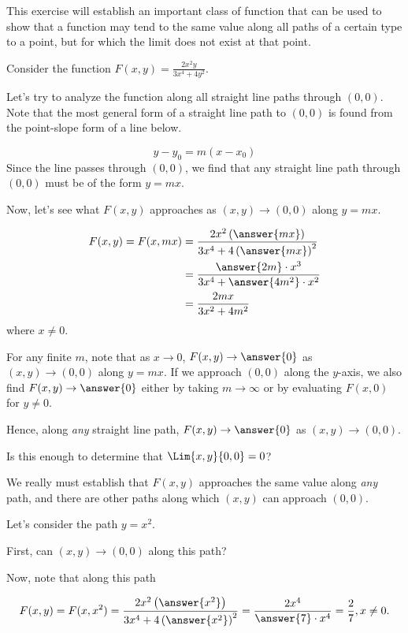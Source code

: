 \documentclass{ximera}
\author{Jim Talamo}
\begin{document}
\begin{exercise}
This exercise will establish an important class of function that can be used to show that a function may tend to the same value along all paths of a certain type to a point, but for which the limit does not exist at that point.

Consider the function $F(x,y) = \frac{2x^2y}{3x^4+4y^2}$.

Let's try to analyze the function along all straight line paths through $(0,0)$.  Note that the most general form of a straight line path to $(0,0)$ is found from the point-slope form of a line below.

\[
y-y_0=m(x-x_0)
\] 
Since the line passes through $(0,0)$, we find that any straight line path through $(0,0)$ must be of the form $y=mx$.

Now, let's see what $F(x,y)$ approaches as $(x,y) \to (0,0)$ along $y=mx$.

\begin{align*}
  F(x,y) = F(x,mx) &= \frac{2x^2\left(\answer{mx}\right)}{3x^4+4\left(\answer{mx}\right)^2} \\
  &= \frac{\answer{2m} \cdot x^3 }{3x^4 + \answer{4m^2}\cdot x^2} \\
  &= \frac{2mx}{3x^2+4m^2}
\end{align*}
where $x \neq 0$.
 
 For any finite $m$, note that as $x \to 0$, $F(x,y) \to \answer{0}$ as $(x,y) \to (0,0)$ along $y=mx$.  If we approach $(0,0)$ along the $y$-axis, we also find $F(x,y) \to \answer{0}$ either by taking $m \to \infty$ or by evaluating $F(x,0)$ for $y \neq 0$.
 
 Hence, along \emph{any} straight line path, $F(x,y) \to \answer{0}$ as $(x,y) \to (0,0)$.
 
 Is this enough to determine that $\Lim{x,y}{0,0} = 0$? 
 
 \begin{exercise}
We really must establish that $F(x,y)$ approaches the same value along \emph{any} path, and there are other paths along which $(x,y)$ can approach $(0,0)$.

Let's consider the path $y=x^2$.  

First, can $(x,y) \to (0,0)$ along this path?  

Now, note that along this path

\[
F(x,y) = F(x,x^2) = \frac{2x^2\left(\answer{x^2}\right)}{3x^4+4\left(\answer{x^2}\right)^2} = \frac{2x^4}{\answer{7} \cdot x^4} = \frac{2}{7} , x \neq 0.
\]


\end{exercise}
\end{exercise}
\end{document}
